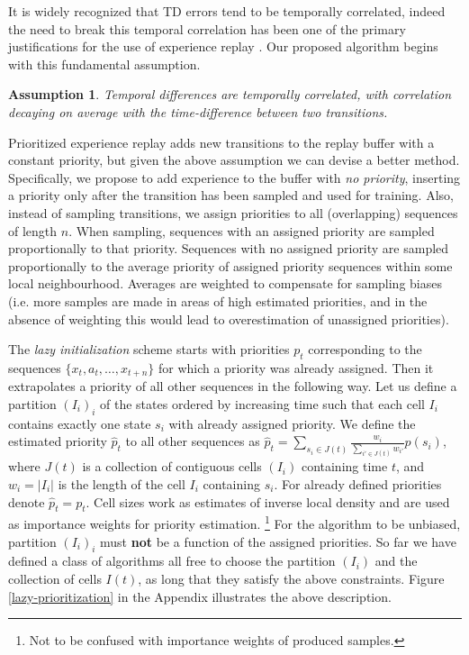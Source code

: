 \documentclass{article}
\newtheorem{assume}{Assumption}
\begin{document}
It is widely recognized that TD errors tend to be temporally correlated, indeed 
the need to 
break this temporal correlation has been one of the primary justifications for 
the use of experience replay \citep{mnih15human}. Our proposed algorithm begins 
with this fundamental assumption.
\begin{assume}
Temporal differences are temporally correlated, with correlation decaying 
on average with the time-difference between two transitions.
\end{assume}
Prioritized experience replay adds new transitions to the replay buffer with a 
constant priority, but given the above assumption we can devise a better 
method. Specifically, we propose to add experience to the buffer with 
\textit{no 
priority}, inserting a priority only after the transition has been 
sampled and used for training. Also, instead of sampling transitions, we 
assign priorities to all (overlapping) sequences of length $n$. When sampling, 
sequences with an assigned 
priority are sampled proportionally to that priority. Sequences with no 
assigned 
priority are sampled proportionally to the average priority of 
assigned priority sequences within some local neighbourhood. Averages are 
weighted to compensate for sampling biases (i.e. more samples 
are made in areas of high estimated priorities, and in the absence of 
weighting this would lead to overestimation of unassigned priorities).

The \textit{lazy initialization} 
scheme starts with priorities $p_{t}$ corresponding to the sequences
$\{x_t, a_t, \ldots, x_{t+n}\}$ for which a priority was already 
assigned. Then it extrapolates a priority of all other sequences in the 
following way. Let us define a partition $(I_i)_i$ of the states ordered by 
increasing time such that each cell $I_i$ contains exactly one state $s_i$ with 
already assigned priority. We define the estimated priority $\hat p_{t}$ to 
all other sequences as $\hat p_{t} = 
\sum_{s_i \in J(t)} \frac{w_i} {\sum_{i'\in J(t)} w_{i'}} p(s_i)$, where 
$J(t)$ is a collection of contiguous cells $(I_i)$ containing time 
$t$, and $w_i= |I_{i}|$ is the length of the cell $I_{i}$ containing $s_i$.
For already defined priorities denote $\hat p_t=p_t$. 
Cell sizes work as estimates of inverse local density and are 
used as importance weights for priority estimation.
\footnote{Not to be confused with importance weights of produced samples.} 
For the algorithm to be unbiased, partition $(I_i)_i$ must 
{\bf not} be a function of the assigned priorities.
So far we have defined a class of algorithms all free to choose the 
partition $(I_i)$ and the collection of cells $I(t)$, as long that they satisfy 
the above constraints. Figure 
\ref{lazy-prioritization} in the Appendix illustrates the above description.
\end{document}
